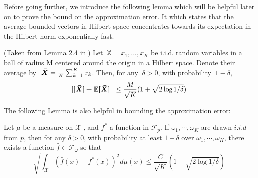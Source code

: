 \documentclass{article}
\begin{document}
Before going further, we introduce the following lemma which will be helpful later on to prove the bound on the approximation error. It which states that the average bounded vectors in Hilbert space concentrates towards its expectation in the Hilbert norm exponentially fast. 

\begin{lemma}
    (Taken from Lemma 2.4 in \citep{NIPS2008_3495}) Let $\ \mathbb{X} = {x_1, ..., x_K}$ be i.i.d. random variables in a ball  of radius M centered around the origin in a Hilbert space. Denote their average by $\ \bm{\Bar{X}} = \frac{1}{K}\sum_{k=1}^{K} x_k$. Then, for any $\ \delta > 0$, with probability $\ 1-\delta$, 
    \begin{align*}
        ||\bm{\Bar{X}] - \mathbb{E}[\bm{\Bar{X}}]}|| \leq \frac{M}{\sqrt{K}}(1 + \sqrt{2\log 1/\delta})
    \end{align*}
    \label{lma:concentration_bound_1}
\end{lemma}

The following Lemma is also helpful in bounding the approximation error:
\begin{lemma}
     Let $\mu$ be a measure on $\mathcal{X}$ , and $f^{*}$
    a function in $\mathcal{F}_p$. If $\omega_1,\cdots, \omega_K$ are drawn $i.i.d$ from $p$,
    then for any $\delta > 0$, with probability at least $1 - \delta$ over $\omega_1,\cdots , \omega_K$, 
    there exists a function $\hat{f} \in \mathcal{\mathcal{F}}_\omega$
    so that
    \[
    \sqrt{\int_\mathcal{X} \left(\hat{f}(x)- f^{*}(x) \right)^2}d\mu(x) \leq \frac{C}{\sqrt{K}} \left( 1+ \sqrt{2 \log 1/\delta}\right)
    \]
    \label{lma:concentration_bound_2}
\end{lemma}
\end{document}
